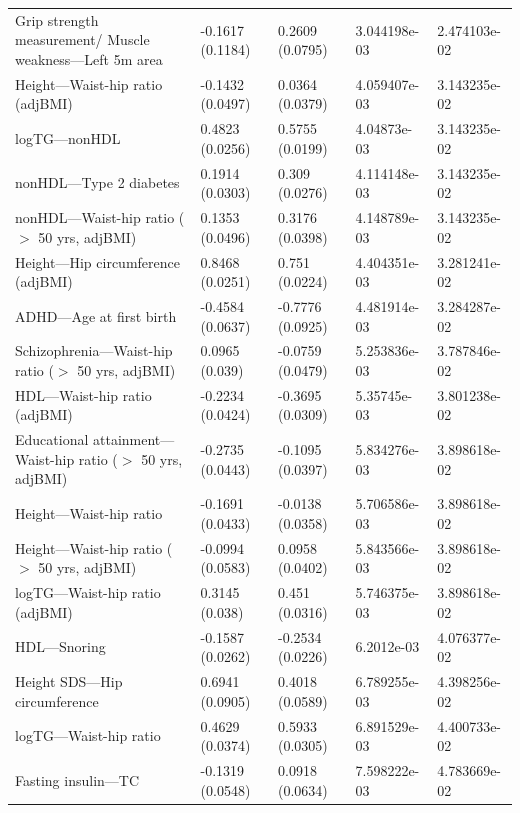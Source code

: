 \begin{table}[ht]
\begin{tabular}{lllll}
  Grip strength measurement/ Muscle weakness---Left 5m area & -0.1617 (0.1184) & 0.2609 (0.0795) & 3.044198e-03 & 2.474103e-02 \\ 
  Height---Waist-hip ratio (adjBMI) & -0.1432 (0.0497) & 0.0364 (0.0379) & 4.059407e-03 & 3.143235e-02 \\ 
  logTG---nonHDL & 0.4823 (0.0256) & 0.5755 (0.0199) & 4.04873e-03 & 3.143235e-02 \\ 
  nonHDL---Type 2 diabetes & 0.1914 (0.0303) & 0.309 (0.0276) & 4.114148e-03 & 3.143235e-02 \\ 
  nonHDL---Waist-hip ratio ($>$ 50 yrs, adjBMI) & 0.1353 (0.0496) & 0.3176 (0.0398) & 4.148789e-03 & 3.143235e-02 \\ 
  Height---Hip circumference (adjBMI) & 0.8468 (0.0251) & 0.751 (0.0224) & 4.404351e-03 & 3.281241e-02 \\ 
  ADHD---Age at first birth & -0.4584 (0.0637) & -0.7776 (0.0925) & 4.481914e-03 & 3.284287e-02 \\ 
  Schizophrenia---Waist-hip ratio ($>$ 50 yrs, adjBMI) & 0.0965 (0.039) & -0.0759 (0.0479) & 5.253836e-03 & 3.787846e-02 \\ 
  HDL---Waist-hip ratio (adjBMI) & -0.2234 (0.0424) & -0.3695 (0.0309) & 5.35745e-03 & 3.801238e-02 \\ 
  Educational attainment---Waist-hip ratio ($>$ 50 yrs, adjBMI) & -0.2735 (0.0443) & -0.1095 (0.0397) & 5.834276e-03 & 3.898618e-02 \\ 
  Height---Waist-hip ratio & -0.1691 (0.0433) & -0.0138 (0.0358) & 5.706586e-03 & 3.898618e-02 \\ 
  Height---Waist-hip ratio ($>$ 50 yrs, adjBMI) & -0.0994 (0.0583) & 0.0958 (0.0402) & 5.843566e-03 & 3.898618e-02 \\ 
  logTG---Waist-hip ratio (adjBMI) & 0.3145 (0.038) & 0.451 (0.0316) & 5.746375e-03 & 3.898618e-02 \\ 
  HDL---Snoring & -0.1587 (0.0262) & -0.2534 (0.0226) & 6.2012e-03 & 4.076377e-02 \\ 
  Height SDS---Hip circumference & 0.6941 (0.0905) & 0.4018 (0.0589) & 6.789255e-03 & 4.398256e-02 \\ 
  logTG---Waist-hip ratio & 0.4629 (0.0374) & 0.5933 (0.0305) & 6.891529e-03 & 4.400733e-02 \\ 
  Fasting insulin---TC & -0.1319 (0.0548) & 0.0918 (0.0634) & 7.598222e-03 & 4.783669e-02 \\ 
   \hline
\end{tabular}
\end{table}


